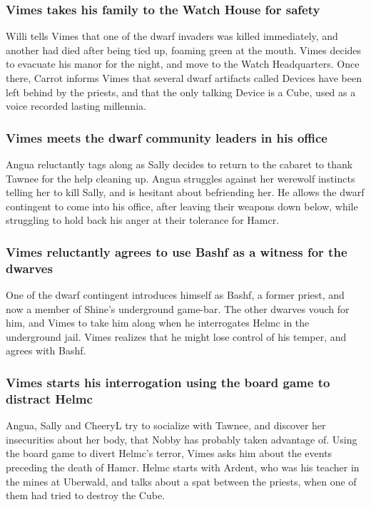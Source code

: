 \subsubsection{\Gls{Vimes} takes his family to the Watch House for safety}
\Gls{Willi} tells \Gls{Vimes} that one of the dwarf invaders was killed immediately, and another
had died after being tied up, foaming green at the mouth. \Gls{Vimes} decides to evacuate his
manor for the night, and move to the Watch Headquarters. Once there, \Gls{Carrot} informs
\Gls{Vimes} that several dwarf artifacts called Devices have been left behind by the priests, and
that the only talking Device is a Cube, used as a voice recorded lasting millennia.

\subsubsection{\Gls{Vimes} meets the dwarf community leaders in his office}
\Gls{Angua} reluctantly tags along as \Gls{Sally} decides to return to the cabaret to thank
\Gls{Tawnee} for the help cleaning up. \Gls{Angua} struggles against her werewolf instincts telling
her to kill \Gls{Sally}, and is hesitant about befriending her. He allows the dwarf contingent to
come into his office, after leaving their weapons down below, while struggling to hold back his
anger at their tolerance for \Gls{Hamcr}.

\subsubsection{\Gls{Vimes} reluctantly agrees to use \Gls{Bashf} as a witness for the dwarves}
One of the dwarf contingent introduces himself as \Gls{Bashf}, a former priest, and now a member
of \Gls{Shine}'s underground game-bar. The other dwarves vouch for him, and \Gls{Vimes} to take him
along when he interrogates \Gls{Helmc} in the underground jail. \Gls{Vimes} realizes that he might
lose control of his temper, and agrees with \Gls{Bashf}.

\subsubsection{\Gls{Vimes} starts his interrogation using the board game to distract \Gls{Helmc}}
\Gls{Angua}, \Gls{Sally} and \Gls{CheeryL} try to socialize with \Gls{Tawnee}, and discover her
insecurities about her body, that \Gls{Nobby} has probably taken advantage of. Using the board game
to divert \Gls{Helmc}'s terror, \Gls{Vimes} asks him about the events preceding the death of
\Gls{Hamcr}. \Gls{Helmc} starts with \Gls{Ardent}, who was his teacher in the mines at Uberwald,
and talks about a spat between the priests, when one of them had tried to destroy the Cube.

